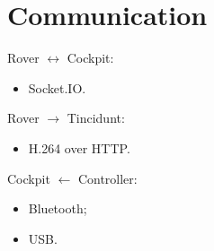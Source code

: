 \section{Communication}

\begin{frame}{\secname}
	Rover $\leftrightarrow$ Cockpit:
	\begin{itemize}
		\item Socket.IO.
	\end{itemize}

	Rover $\rightarrow$ Tincidunt:
	\begin{itemize}
		\item H.264 over HTTP.
	\end{itemize}

	Cockpit $\leftarrow$ Controller:
	\begin{itemize}
		\item Bluetooth;
		\item USB.
	\end{itemize}
\end{frame}
